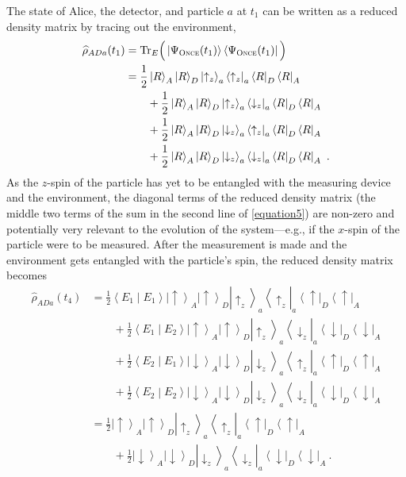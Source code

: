 \documentclass[12pt,onecolumn,secnumarabic,amsmath,amssymb,balancelastpage,nofootinbib]{article}
\newcommand{\bra}[1]{\ensuremath{\left\langle#1\right|}}
\newcommand{\ket}[1]{\ensuremath{\left|#1\right\rangle}}
\newcommand{\bracket}[2]{\ensuremath{\left\langle #1 \middle| #2 \right\rangle}}
\begin{document}
The state of Alice, the detector, and particle $a$ at $t_1$ can be written as a reduced density matrix by tracing out the environment,
\begin{align}
\widehat{\rho}_{ADa}(t_1)&=\text{Tr}_E\Big(\ket{\Psi_{\textsc{Once}}(t_1)}\bra{\Psi_{\textsc{Once}}(t_1)}\Big)
\nonumber
\\
&=\frac{1}{2}\ket{R}_A\ket{R}_{D}\ket{\uparrow_z}_a\bra{\uparrow_z}_a\bra{R}_{D}\bra{R}_A\nonumber\\
&\qquad+\frac{1}{2}\ket{R}_A\ket{R}_{D}\ket{\uparrow_z}_a\bra{\downarrow_z}_a\bra{R}_{D}\bra{R}_A
\nonumber
\\
&\qquad +\frac{1}{2}\ket{R}_A\ket{R}_{D}\ket{\downarrow_z}_a\bra{\uparrow_z}_a\bra{R}_{D}\bra{R}_A\nonumber\\
&\qquad +\frac{1}{2}\ket{R}_A\ket{R}_{D}\ket{\downarrow_z}_a\bra{\downarrow_z}_a\bra{R}_{D}\bra{R}_A\ .
\label{equation5}
\end{align}
As the $z$-spin of the particle has yet to be entangled with the measuring device and the environment, the diagonal terms of the reduced density matrix (the middle two terms of the sum in the second line of \eqref{equation5}) are non-zero and potentially very relevant to the evolution of the system---e.g., if the $x$-spin of the particle were to be measured.  After the measurement is made and the environment gets entangled with the particle's spin, the reduced density matrix becomes
\begin{align}
\widehat{\rho}_{ADa}(t_4)&=\frac{1}{2}\bracket{E_1}{E_1}\ket{\uparrow}_A\ket{\uparrow}_{D}\ket{\uparrow_z}_a\bra{\uparrow_z}_a\bra{\uparrow}_{D}\bra{\uparrow}_A\nonumber\\
&\qquad+\frac{1}{2}\bracket{E_1}{E_2}\ket{\uparrow}_A\ket{\uparrow}_{D}\ket{\uparrow_z}_a\bra{\downarrow_z}_a\bra{\downarrow}_{D}\bra{\downarrow}_A
\nonumber
\\
&\qquad +\frac{1}{2}\bracket{E_2}{E_1}\ket{\downarrow}_A\ket{\downarrow}_{D}\ket{\downarrow_z}_a\bra{\uparrow_z}_a\bra{\uparrow}_{D}\bra{\uparrow}_A\nonumber\\
&\qquad+\frac{1}{2}\bracket{E_2}{E_2}\ket{\downarrow}_A\ket{\downarrow}_{D}\ket{\downarrow_z}_a\bra{\downarrow_z}_a\bra{\downarrow}_{D}\bra{\downarrow}_A
\nonumber
\\
&=\frac{1}{2}\ket{\uparrow}_A\ket{\uparrow}_{D}\ket{\uparrow_z}_a\bra{\uparrow_z}_a\bra{\uparrow}_{D}\bra{\uparrow}_A\nonumber\\
&\qquad+\frac{1}{2}\ket{\downarrow}_A\ket{\downarrow}_{D}\ket{\downarrow_z}_a\bra{\downarrow_z}_a\bra{\downarrow}_{D}\bra{\downarrow}_A
\ .
\label{redu}
\end{align}
\end{document}
